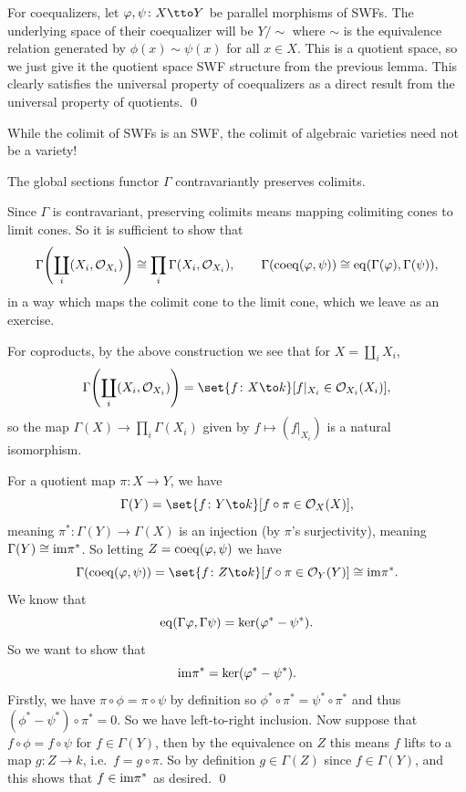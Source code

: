    For coequalizers, let $\phi,\psi\colon X\tto Y$ be parallel morphisms of SWFs.
    The underlying space of their coequalizer will be $Y/{\sim}$ where $\sim$ is the equivalence relation generated by $\phi(x)\sim\psi(x)$ for all $x\in X$.
    This is a quotient space, so we just give it the quotient space SWF structure from the previous lemma.
    This clearly satisfies the universal property of coequalizers as a direct result from the universal property of quotients.
    \qed

\eproof

\bnote

    While the colimit of SWFs is an SWF, the colimit of algebraic varieties need not be a variety!

\enote

\bcoro

    The global sections functor $\Gamma$ contravariantly preserves colimits.

\ecoro

\bproof

    Since $\Gamma$ is contravariant, preserving colimits means mapping colimiting cones to limit cones.
    So it is sufficient to show that
    $$ \Gamma\mathopen{}\mathclose{\left(\coprod_i(X_i,{{\cal O}}_{X_i})\right)} \cong \prod_i\Gamma(X_i,{{\cal O}}_{X_i}),\qquad \Gamma({\rm coeq}(\varphi,\psi)) \cong {\rm eq}(\Gamma(\varphi),\Gamma(\psi)) , $$
    in a way which maps the colimit cone to the limit cone, which we leave as an exercise.

    For coproducts, by the above construction we see that for $X=\coprod_iX_i$,
    $$ \Gamma\parens{\coprod_i(X_i,\O_{X_i})} = \set{f\colon X\to k}[f|_{X_i}\in\O_{X_i}(X_i)] , $$
    so the map $\Gamma(X)\to\prod_i\Gamma(X_i)$ given by $f\mapsto(f|_{X_i})$ is a natural isomorphism.

    For a quotient map $\pi\colon X\to Y$, we have
    $$ \Gamma(Y) = \set{f\colon Y\to k}[f\circ\pi\in\O_X(X)] , $$
    meaning $\pi^*\colon\Gamma(Y)\to\Gamma(X)$ is an injection (by $\pi$'s surjectivity), meaning $\Gamma(Y)\cong{\rm im}\pi^*$.
    So letting $Z={\rm coeq}(\varphi,\psi)$ we have
    $$ \Gamma(\coeq(\phi,\psi)) = \set{f\colon Z\to k}[f\circ\pi\in\O_Y(Y)] \cong \im\pi^* . $$
    We know that
    $$ {\rm eq}(\Gamma\varphi,\Gamma\psi) = \mathop{\rm ker}(\varphi^*-\psi^*) . $$
    So we want to show that
    $$ {\rm im}\pi^* = \mathop{\rm ker}(\varphi^*-\psi^*) . $$
    Firstly, we have $\pi\circ\phi=\pi\circ\psi$ by definition so $\phi^*\circ\pi^*=\psi^*\circ\pi^*$ and thus $(\phi^*-\psi^*)\circ\pi^*=0$.
    So we have left-to-right inclusion.
    Now suppose that $f\circ\phi=f\circ\psi$ for $f\in\Gamma(Y)$, then by the equivalence on $Z$ this means $f$ lifts to a map $g\colon Z\to k$, i.e.\ $f=g\circ\pi$.
    So by definition $g\in\Gamma(Z)$ since $f\in\Gamma(Y)$, and this shows that $f\in{\rm im}\pi^*$ as desired.
    \qed

